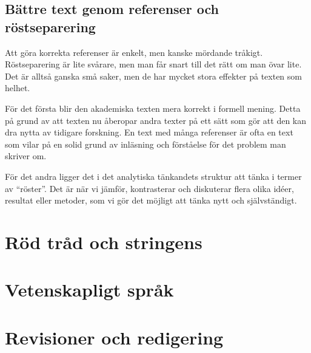 \documentclass[11pt,a5paper,footinclude=true,headinclude=true]{scrbook} %
\begin{document}
\section{Bättre text genom referenser och röstseparering}

Att göra korrekta referenser är enkelt, men kanske mördande tråkigt. Röstseparering är lite svårare, men man får snart till det rätt om man övar lite. Det är alltså ganska små saker, men de har mycket stora effekter på texten som helhet. 

För det första blir den akademiska texten mera korrekt i formell mening. Detta på grund av att texten nu åberopar andra texter på ett sätt som gör att den kan dra nytta av tidigare forskning. En text med många referenser är ofta en text som vilar på en solid grund av inläsning och förståelse för det problem man skriver om. 

För det andra ligger det i det analytiska tänkandets struktur att tänka i termer av ``röster''. Det är när vi jämför, kontrasterar och diskuterar flera olika idéer, resultat eller metoder, som vi gör det möjligt att tänka nytt och självständigt. 

    
    \chapter{Röd tråd och stringens}



        
    \chapter{Vetenskapligt språk}
            
    \chapter{Revisioner och redigering}
    
    
\printbibliography
\end{document}
